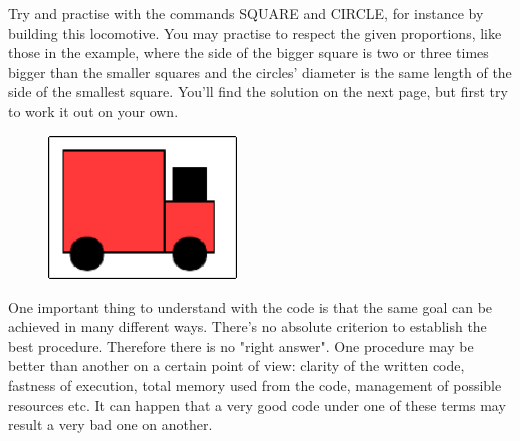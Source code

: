 \vskip 1cm

\begin{minipage}{0.40\textwidth}

Try and practise with the commands SQUARE and CIRCLE, for instance by building this locomotive. You may practise to respect the given proportions, like those in the example, where the side of the bigger square is two or three times bigger than the smaller squares and the circles' diameter is the same length of the side of the smallest square. You'll find the solution on the next page, but first try to work it out on your own.
 
\end{minipage}
\begin{minipage}{0.4\textwidth}
\begin{figure}[H]
   \includegraphics[width=5.0cm,trim=4 4 8 4,clip]{./images/disegnare/disegnare-21.png}
   \label{dis-20}
\end{figure}
\end{minipage} \hfill

\vskip 1cm


One important thing to understand with the code is that the same goal can be achieved in many different ways. There's no absolute criterion to establish the best procedure. Therefore there is no "right answer". One procedure may be better than another on a certain point of view: clarity of the written code, fastness of execution, total memory used from the code, management of possible resources etc. It can happen that a very good code under one of these terms may result a very bad one on another.
 

\newpage

